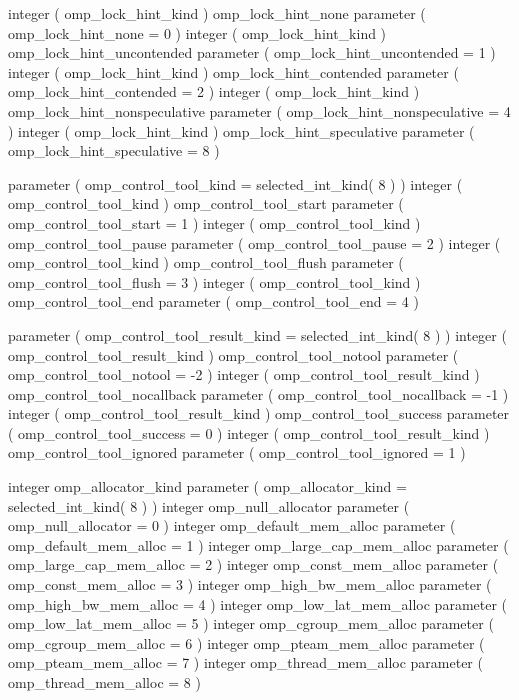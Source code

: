 {\begin{codepar}
     integer ( omp\_lock\_hint\_kind ) omp\_lock\_hint\_none
     parameter ( omp\_lock\_hint\_none = 0 )
     integer ( omp\_lock\_hint\_kind ) omp\_lock\_hint\_uncontended
     parameter ( omp\_lock\_hint\_uncontended = 1 )
     integer ( omp\_lock\_hint\_kind ) omp\_lock\_hint\_contended
     parameter ( omp\_lock\_hint\_contended = 2 )
     integer ( omp\_lock\_hint\_kind ) omp\_lock\_hint\_nonspeculative
     parameter ( omp\_lock\_hint\_nonspeculative = 4 )
     integer ( omp\_lock\_hint\_kind ) omp\_lock\_hint\_speculative
     parameter ( omp\_lock\_hint\_speculative = 8 )
\begin{samepage}
     parameter ( omp\_control\_tool\_kind = selected\_int\_kind( 8 ) )
     integer ( omp\_control\_tool\_kind ) omp\_control\_tool\_start 
     parameter ( omp\_control\_tool\_start = 1 )
     integer ( omp\_control\_tool\_kind ) omp\_control\_tool\_pause 
     parameter ( omp\_control\_tool\_pause = 2 )
     integer ( omp\_control\_tool\_kind ) omp\_control\_tool\_flush 
     parameter ( omp\_control\_tool\_flush = 3 )
     integer ( omp\_control\_tool\_kind ) omp\_control\_tool\_end 
     parameter ( omp\_control\_tool\_end = 4 )
\end{samepage}
\begin{samepage}
     parameter ( omp\_control\_tool\_result\_kind = selected\_int\_kind( 8 ) )
     integer ( omp\_control\_tool\_result\_kind ) omp_control_tool_notool 
     parameter ( omp_control_tool_notool = -2 )
     integer ( omp\_control\_tool\_result\_kind ) omp_control_tool_nocallback
     parameter ( omp_control_tool_nocallback = -1 )
     integer ( omp\_control\_tool\_result\_kind ) omp_control_tool_success
     parameter ( omp_control_tool_success = 0 )
     integer ( omp\_control\_tool\_result\_kind ) omp_control_tool_ignored 
     parameter ( omp_control_tool_ignored = 1 )
\end{samepage}
\begin{samepage}
     integer omp\_allocator\_kind
     parameter ( omp\_allocator\_kind = selected\_int\_kind( 8 ) )
     integer omp\_null\_allocator
     parameter ( omp\_null\_allocator = 0 )
     integer omp\_default\_mem\_alloc
     parameter ( omp\_default\_mem\_alloc = 1 )
     integer omp\_large\_cap\_mem\_alloc
     parameter ( omp\_large\_cap\_mem\_alloc = 2 )
     integer omp\_const\_mem\_alloc
     parameter ( omp\_const\_mem\_alloc = 3 )
     integer omp\_high\_bw\_mem\_alloc
     parameter ( omp\_high\_bw\_mem\_alloc = 4 )
     integer omp\_low\_lat\_mem\_alloc
     parameter ( omp\_low\_lat\_mem\_alloc = 5 )
     integer omp\_cgroup\_mem\_alloc
     parameter ( omp\_cgroup\_mem\_alloc = 6 )
     integer omp\_pteam\_mem\_alloc
     parameter ( omp\_pteam\_mem\_alloc = 7 )
     integer omp\_thread\_mem\_alloc
     parameter ( omp\_thread\_mem\_alloc = 8 )
\end{samepage}
\end{codepar}}

